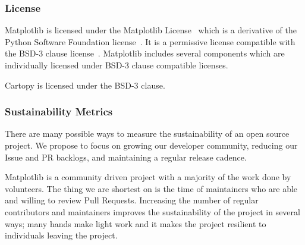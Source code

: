 \documentclass[12pt]{article}
\numberwithin{page}{section}
\begin{document}

\subsubsection{License}

Matplotlib is licensed under the Matplotlib License~\cite{mpl_lic} which is a
derivative of the Python Software Foundation license~\cite{psf_lic}.  It is a
permissive license compatible with the BSD-3 clause
license~\cite{jdh_bsd_opinions}.  Matplotlib includes several components which
are individually licensed under BSD-3 clause compatible licenses.

Cartopy is licensed under the BSD-3 clause.


\subsubsection{Sustainability Metrics}

There are many possible ways to measure the sustainability of an
open source project.  We propose to focus on growing our developer
community, reducing our Issue and PR backlogs, and maintaining a
regular release cadence.

Matplotlib is a community driven project with a majority of the
work done by volunteers.  The thing we are shortest on is the time of
maintainers who are able and willing to review Pull Requests.
Increasing the number of regular contributors and maintainers improves
the sustainability of the project in several ways; many hands make
light work and it makes the project resilient to individuals leaving
the project.
\end{document}
